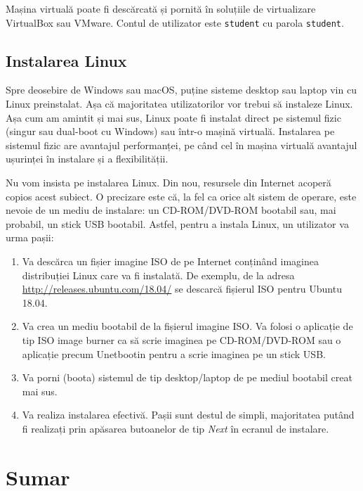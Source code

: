 Mașina virtuală poate fi descărcată și pornită în soluțiile de virtualizare VirtualBox sau VMware. Contul de utilizator este \texttt{student} cu parola \texttt{student}.

\subsection{Instalarea Linux}
\label{sec:intro:linux-install}

Spre deosebire de Windows sau macOS, puține sisteme desktop sau laptop vin cu Linux preinstalat. Așa că majoritatea utilizatorilor vor trebui să instaleze Linux. Așa cum am amintit și mai sus, Linux poate fi instalat direct pe sistemul fizic (singur sau dual-boot cu Windows) sau într-o mașină virtuală. Instalarea pe sistemul fizic are avantajul performanței, pe când cel în mașina virtuală avantajul ușurinței în instalare și a flexibilității.

Nu vom insista pe instalarea Linux. Din nou, resursele din Internet acoperă copios acest subiect. O precizare este că, la fel ca orice alt sistem de operare, este nevoie de un mediu de instalare: un CD-ROM/DVD-ROM bootabil sau, mai probabil, un stick USB bootabil. Astfel, pentru a instala Linux, un utilizator va urma pașii:

\begin{enumerate}
  \item Va descărca un fișier imagine ISO de pe Internet conținând imaginea distribuției Linux care va fi instalată. De exemplu, de la adresa \url{http://releases.ubuntu.com/18.04/} se descarcă fișierul ISO pentru Ubuntu 18.04.
  \item Va crea un mediu bootabil de la fișierul imagine ISO. Va folosi o aplicație de tip ISO image burner ca să scrie imaginea pe CD-ROM/DVD-ROM sau o aplicație precum Unetbootin pentru a scrie imaginea pe un stick USB.
  \item Va porni (boota) sistemul de tip desktop/laptop de pe mediul bootabil creat mai sus.
  \item Va realiza instalarea efectivă. Pașii sunt destul de simpli, majoritatea putând fi realizați prin apăsarea butoanelor de tip \textit{Next} în ecranul de instalare.
\end{enumerate}

\section{Sumar}
\label{sec:intro:summary}

